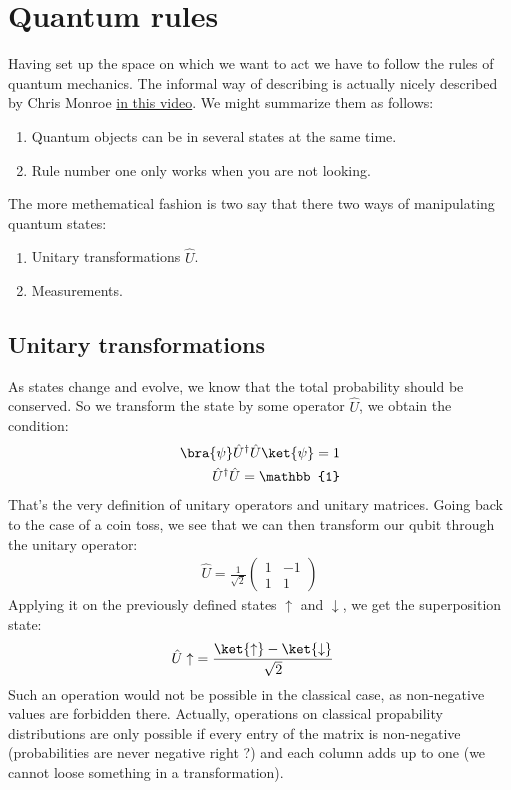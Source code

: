 \section{Quantum rules}
Having set up the space on which we want to act we have to follow the rules of quantum mechanics. The informal way of describing is actually nicely described by Chris Monroe \href{https://youtu.be/CC7nlBM2cSM}{in this video}. We might summarize them as follows:
\begin{enumerate}
\item Quantum objects can be in several states at the same time.
\item Rule number one only works when you are not looking.
\end{enumerate}

The more methematical fashion is two say that there two ways of manipulating quantum states:
\begin{enumerate}
\item Unitary transformations $\hat{U}$.
\item Measurements.
\end{enumerate}

\subsection{Unitary transformations}
As states change and evolve, we know that the total probability should be conserved. So we transform the state by some operator $\hat{U}$, we obtain the condition:
\begin{align}
\bra{\psi}\hat{U}^\dag\hat{U} \ket{\psi} = 1\\
\hat{U}^\dag\hat{U}  = \mathbb{1}
\end{align}
That's the very definition of unitary operators and unitary matrices.
Going back to the case of a coin toss, we see that we can then transform our qubit through the unitary operator:
\begin{align}
\hat{U}=\frac{1}{\sqrt{2}}\left(\begin{array}{cc}
1 & -1\\
1 & 1
\end{array}\right)
\end{align}
Applying it on the previously defined states $\uparrow$ and $\downarrow$, we get the superposition state:
\begin{align}
\hat{U}\uparrow &= \frac{\ket{\uparrow}-\ket{\downarrow}}{\sqrt{2}}
\end{align}
Such an operation would not be possible in the classical case, as non-negative values are forbidden there. Actually, operations on classical propability distributions are only possible if every entry of the matrix is non-negative (probabilities are never negative right ?) and each column adds up to one (we cannot loose something in a transformation).